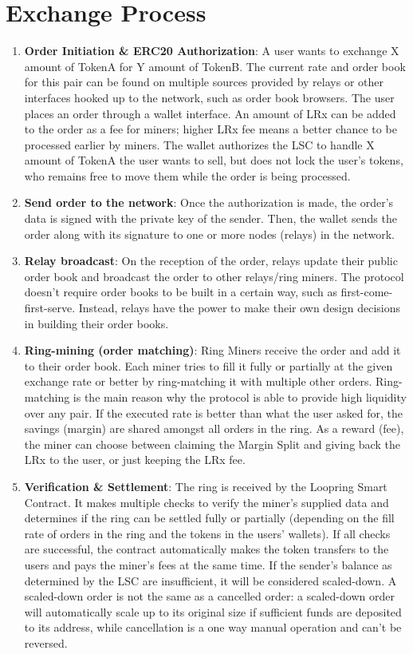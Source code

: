 \documentclass[UTF8,nofonts]{article}
\begin{document}
\section{Exchange Process}
\begin{enumerate} 

\item \textbf{Order Initiation \& ERC20 Authorization}: A user wants to exchange X amount of TokenA for Y amount of TokenB. The current rate and order book for this pair can be found on multiple sources provided by relays or other interfaces hooked up to the network, such as order book browsers. The user places an order through a wallet interface. An amount of LRx can be added to the order as a fee for miners; higher LRx fee means a better chance to be processed earlier by miners. The wallet authorizes the LSC to handle X amount of TokenA the user wants to sell, but does not lock the user's tokens, who remains free to move them while the order is being processed.

\item \textbf{Send order to the network}: Once the authorization is made, the order's data is signed with the private key of the sender. Then, the wallet sends the order along with its signature to one or more nodes (relays) in the network.

\item \textbf{Relay broadcast}: On the reception of the order, relays update their public order book and broadcast the order to other relays/ring miners. The protocol doesn't require order books to be built in a certain way, such as first-come-first-serve. Instead, relays have the power to make their own design decisions in building their order books.

\item \textbf{Ring-mining (order matching)}: Ring Miners receive the order and add it to their order book. Each miner tries to fill it fully or partially at the given exchange rate or better by ring-matching it with multiple other orders. Ring-matching is the main reason why the protocol is able to provide high liquidity over any pair. If the executed rate is better than what the user asked for, the savings (margin) are shared amongst all orders in the ring. As a reward (fee), the miner can choose between claiming the Margin Split and giving back the LRx to the user, or just keeping the LRx fee.

\item \textbf{Verification \& Settlement}: The ring is received by the Loopring Smart Contract. It makes multiple checks to verify the miner's supplied data and determines if the ring can be settled fully or partially (depending on the fill rate of orders in the ring and the tokens in the users' wallets). If all checks are successful, the contract automatically makes the token transfers to the users and pays the miner's fees at the same time. If the sender's balance as determined by the LSC are insufficient, it will be considered scaled-down. A scaled-down order is not the same as a cancelled order: a scaled-down order will automatically scale up to its original size if sufficient funds are deposited to its address, while cancellation is a one way manual operation and can't be reversed.


\end{enumerate}
\end{document}

